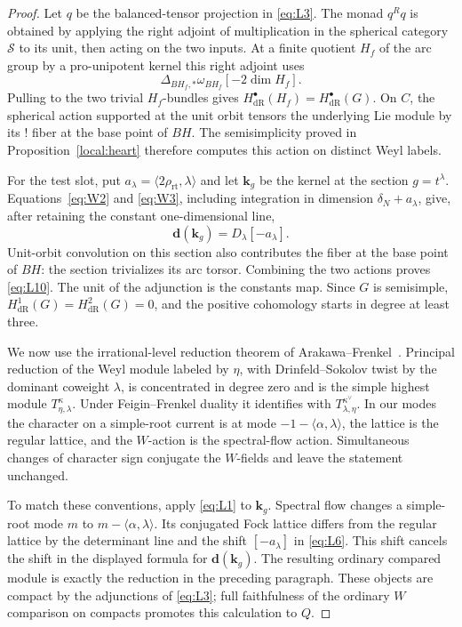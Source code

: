 \begin{proof}
Let $q$ be the balanced-tensor projection in \eqref{eq:L3}.
The monad $q^Rq$ is obtained by applying the right adjoint of
multiplication in the spherical category $\mathcal S$ to its unit,
then acting on the two inputs.  At a finite quotient $H_f$ of the
arc group by a pro-unipotent kernel this right adjoint uses
\[
              \Delta_{BH_f,*}\omega_{BH_f}[-2\dim H_f].
\]
Pulling to the two trivial $H_f$-bundles gives
$H^\bullet_{\mathrm{dR}}(H_f)=H^\bullet_{\mathrm{dR}}(G)$.
On $C$, the spherical action supported at the unit orbit tensors
the underlying Lie module by its ! fiber at the base point of
$BH$.  The semisimplicity proved in Proposition~\ref{local:heart}
therefore computes this action on distinct Weyl labels.

For the test slot, put
$a_\lambda=\langle2\rho_{\mathrm{rt}},\lambda\rangle$ and let
$\mathbf k_g$ be the kernel at the section $g=t^\lambda$.
Equations~\eqref{eq:W2} and \eqref{eq:W3}, including integration
in dimension $\delta_N+a_\lambda$, give, after retaining the
constant one-dimensional line,
\[
                   \mathbf d(\mathbf k_g)=D_\lambda[-a_\lambda].
\]
Unit-orbit convolution on this section also contributes the fiber
at the base point of $BH$: the section trivializes its arc torsor.
Combining the two actions proves \eqref{eq:L10}.  The unit of the
adjunction is the constants map.  Since $G$ is semisimple,
$H^1_{\mathrm{dR}}(G)=H^2_{\mathrm{dR}}(G)=0$, and the positive
cohomology starts in degree at least three.

We now use the irrational-level reduction theorem of
Arakawa--Frenkel~\cite[Theorems~2.1--2.3]{ArakawaFrenkel}.
Principal reduction of the
Weyl module labeled by $\eta$, with Drinfeld--Sokolov twist by the
dominant coweight $\lambda$, is concentrated in degree zero and
is the simple highest module $T^\kappa_{\eta,\lambda}$.  Under
Feigin--Frenkel duality it identifies with
$T^{\kappa^\vee}_{\lambda,\eta}$.  In our modes the character on
a simple-root current is at mode
$-1-\langle\alpha,\lambda\rangle$, the lattice is the regular
lattice, and the $W$-action is the spectral-flow action.  Simultaneous
changes of character sign conjugate the $W$-fields and leave the
statement unchanged.

To match these conventions, apply \eqref{eq:L1} to $\mathbf k_g$.
Spectral flow changes a simple-root mode $m$ to
$m-\langle\alpha,\lambda\rangle$.  Its conjugated Fock lattice
differs from the regular lattice by the determinant line and the
shift $[-a_\lambda]$ in \eqref{eq:L6}.  This shift cancels the
shift in the displayed formula for $\mathbf d(\mathbf k_g)$.
The resulting ordinary compared module is exactly the reduction
in the preceding paragraph.  These objects are compact by the
adjunctions of \eqref{eq:L3}; full faithfulness of the ordinary
$W$ comparison on compacts promotes this calculation to $Q$.


\end{proof}
